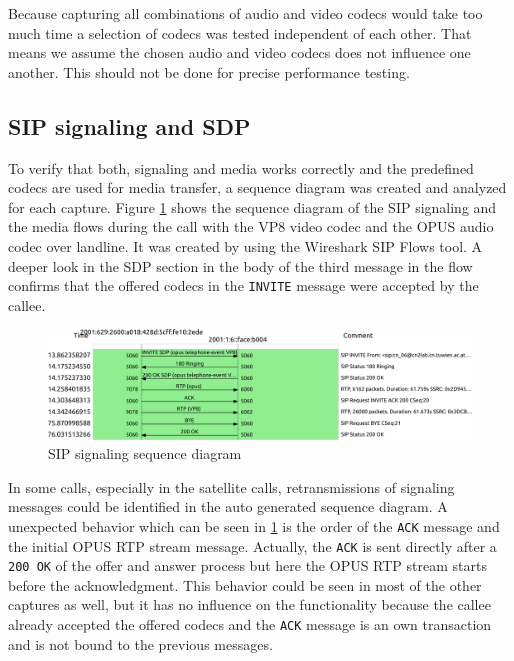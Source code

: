 \documentclass[parskip=full]{scrartcl}
\begin{document}
Because capturing all combinations of audio and video codecs would take too much time a selection of codecs was tested independent of each other.
That means we assume the chosen audio and video codecs does not influence one another.
This should not be done for precise performance testing.

\subsection{SIP signaling and SDP} \label{subsec:signaling}

To verify that both, signaling and media works correctly and the predefined codecs are used for media transfer, a sequence diagram was created and analyzed for each capture.
Figure \ref{fig:sigFlow} shows the sequence diagram of the SIP signaling and the media flows during the call with the VP8 video codec and the OPUS audio codec over landline. 
It was created by using the Wireshark SIP Flows tool. 
A deeper look in the SDP section in the body of the third message in the flow confirms that the offered codecs in the \verb|INVITE| message were accepted by the callee.

\begin{figure}[!ht]
	\centering %
	\includegraphics[width=\textwidth]{images/VP8_OPUS_landline_flow.pdf} %
	\caption{SIP signaling sequence diagram} 
	\label{fig:sigFlow} %
\end{figure} 
In some calls, especially in the satellite calls, retransmissions of signaling messages could be identified in the auto generated sequence diagram. 
A unexpected behavior which can be seen in \cref{fig:sigFlow} is the order of the \verb|ACK| message and the initial OPUS RTP stream message. 
Actually, the \verb|ACK| is sent directly after a \verb|200 OK| of the offer and answer process but here the OPUS RTP stream starts before the acknowledgment.
This behavior could be seen in most of the other captures as well, but it has no influence on the functionality because the callee already accepted the offered codecs and the \verb|ACK| message is an own transaction and is not bound to the previous messages.
\end{document}
